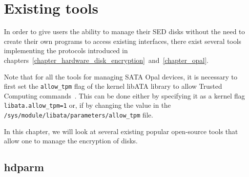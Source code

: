 
\chapter{Existing tools}
\label{chapter_tools}

In order to give users the ability to manage their SED disks without the need to create their own programs to access existing interfaces, there exist several tools implementing the protocols introduced in chapters~\ref{chapter_hardware_disk_encryption}~and~\ref{chapter_opal}. 

Note that for all the tools for managing SATA Opal devices, it is necessary to first set the \verb|allow_tpm| flag of the kernel libATA library to allow Trusted Computing commands~\cite{acs-3}. This can be done either by specifying it as a kernel flag \verb|libata.allow_tpm=1| or, if  by changing the value in the \verb|/sys/module/libata/parameters/allow_tpm| file.~\cite{TODO}

In this chapter, we will look at several existing popular open-source tools that allow one to manage the encryption of disks.



\section{hdparm}
 
